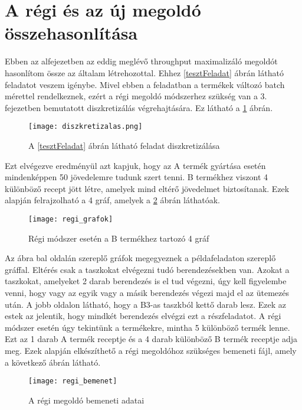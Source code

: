 \section{A régi és az új megoldó összehasonlítása}
Ebben az alfejezetben az eddig meglévő throughput maximalizáló megoldót hasonlítom össze az általam létrehozottal.
Ehhez \ref{tesztFeladat} ábrán látható feladatot veszem igénybe.
Mivel ebben a feladatban a termékek változó batch mérettel rendelkeznek, ezért a régi megoldó módszerhez szükség van a 3. fejezetben bemutatott diszkretizálás végrehajtására.
Ez látható a \ref{diszkretizalas} ábrán.

\begin{figure}[H]
\begin{center}
\texttt{[image: diszkretizalas.png]}
\caption{A \ref{tesztFeladat} ábrán látható feladat diszkretizálása}
\label{diszkretizalas}
\end{center}
\end{figure}

Ezt elvégezve eredményül azt kapjuk, hogy az A termék gyártása esetén mindenképpen 50 jövedelemre tudunk szert tenni.
B termékhez viszont 4 különböző recept jött létre, amelyek mind eltérő jövedelmet biztosítanak.
Ezek alapján felrajzolható a 4 gráf, amelyek a \ref{regi_grafok} ábrán láthatóak.

\begin{figure}[H]
\begin{center}
\texttt{[image: regi\_grafok]}
\caption{Régi módszer esetén a B termékhez tartozó 4 gráf}
\label{regi_grafok}
\end{center}
\end{figure}

Az ábra bal oldalán szereplő gráfok megegyeznek a példafeladaton szereplő gráffal.
Eltérés csak a taszkokat elvégezni tudó berendezésekben van.
Azokat a  taszkokat, amelyeket 2 darab berendezés is el tud végezni, úgy kell figyelembe venni, hogy vagy az egyik vagy a másik berendezés végezi majd el az ütemezés után.
A jobb oldalon látható, hogy a B3-as taszkból kettő darab lesz.
Ezek az estek az jelentik, hogy mindkét berendezés elvégzi ezt a részfeladatot.
A régi módszer esetén úgy tekintünk a termékekre, mintha 5 különböző termék lenne.
Ezt az 1 darab A termék receptje és a 4 darab különböző B termék receptje adja meg.
Ezek alapján elkészíthető a régi megoldóhoz szükséges bemeneti fájl, amely a következő ábrán látható. 

\begin{figure}[H]
\begin{center}
\texttt{[image: regi\_bemenet]}
\caption{A régi megoldó bemeneti adatai}
\label{regi_bemenet}
\end{center}
\end{figure}

